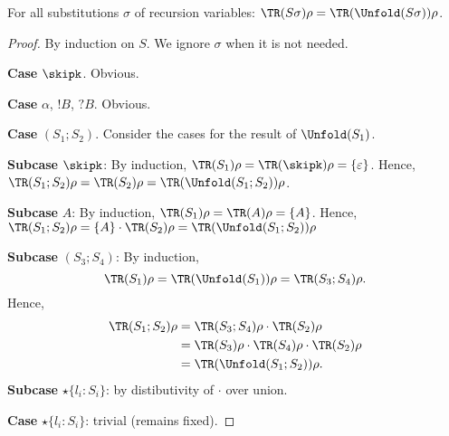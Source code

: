 \begin{lemma}
  \label{lemma:tr-unfold}
  For all substitutions $\sigma$ of recursion variables:
  $\TR (S\sigma)\rho = \TR (\Unfold (S\sigma))\rho$.
\end{lemma}
\begin{proof}
  By induction on $S$. We ignore $\sigma$ when it is not
  needed. 

  \textbf{Case }$\skipk$. Obvious.

  \textbf{Case }$\alpha$, $!B$, $?B$. Obvious. 

  \textbf{Case }$(S_1;S_2)$. Consider the cases for the result of $\Unfold (S_1)$.

  \textbf{Subcase }$\skipk$:
  By induction, $\TR (S_1)\rho = \TR (\skipk)\rho = \{\varepsilon\}$.
  Hence, 
  $\TR (S_1; S_2)\rho = \TR (S_2)\rho =
  \TR (\Unfold (S_1;S_2))\rho$.


  \textbf{Subcase }$A$:
  By induction, $\TR (S_1)\rho = \TR (A) \rho = \{A\}$.
  Hence,
  $\TR (S_1; S_2)\rho = \{A\} \cdot \TR (S_2)\rho =
  \TR (\Unfold (S_1;S_2))\rho$

  \textbf{Subcase }$(S_3; S_4)$:
  By induction, $$\TR (S_1)\rho = \TR (\Unfold (S_1)) \rho = \TR (S_3;  S_4) \rho.$$
  Hence,
  \begin{align*}
    \TR (S_1;S_2)\rho & = \TR (S_3;S_4)\rho \cdot \TR (S_2) \rho \\
                      &=  \TR (S_3) \rho \cdot  \TR(S_4)\rho \cdot \TR (S_2) \rho\\
                      &= \TR (\Unfold (S_1;S_2))\rho
                        .
  \end{align*}
  \textbf{Subcase }$\star\{l_i\colon S_i\}$: by distibutivity of $\cdot$ over union.

  \textbf{Case }$\star\{l_i\colon S_i\}$: trivial (remains fixed).


\end{proof}
